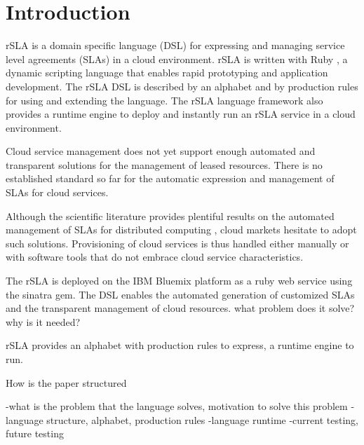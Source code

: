 \section{Introduction}
\label{sec:introduction}

rSLA is a domain specific language (DSL) for expressing and managing service level agreements (SLAs) in a cloud environment. rSLA is written with Ruby 
\cite{ruby}, a dynamic scripting language that enables rapid prototyping and application development. The rSLA DSL is described by an alphabet and by 
production rules for using and extending the language. The rSLA language framework also provides a runtime engine to deploy and instantly run an rSLA 
service in a cloud environment.

Cloud service management does not yet support enough automated and transparent solutions for the management of leased resources. There is no 
established standard so far for the automatic expression and management of SLAs for cloud services.

Although the scientific literature provides plentiful results on the automated management of SLAs for distributed computing \cite{wsla, wsag, more}, 
cloud markets hesitate to adopt such solutions. Provisioning of cloud services is thus handled either manually or with software tools that do not 
embrace cloud service characteristics.

The rSLA is deployed on the IBM Bluemix platform as a ruby web service using the sinatra gem. 
The DSL enables the automated generation of customized SLAs and the transparent management of cloud resources.
what problem does it solve? why is it needed?

rSLA provides an alphabet with production rules to express, a runtime engine to run.

How is the paper structured

-what is the problem that the language solves, motivation to solve this problem
-language structure, alphabet, production rules
-language runtime
-current testing, future testing